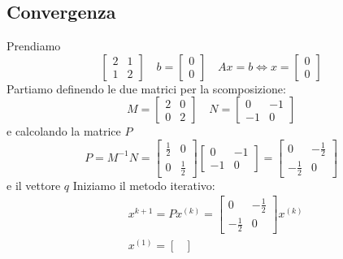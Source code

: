 \subsection{Convergenza}
\begin{example}
	Prendiamo
	\begin{equation*}
		\begin{bmatrix}
			2 & 1 \\
			1 & 2
		\end{bmatrix} \quad
		b = \begin{bmatrix}
			0 \\ 0
		\end{bmatrix} \quad
		Ax=b \Leftrightarrow x=\begin{bmatrix}
			0 \\ 0
		\end{bmatrix}
	\end{equation*}
	Partiamo definendo le due matrici per la scomposizione:
	\begin{equation*}
		M=\begin{bmatrix}
			2 & 0 \\ 0 & 2
		\end{bmatrix} \quad
		N = \begin{bmatrix}
			0 & -1 \\ -1 & 0
		\end{bmatrix}
	\end{equation*}
	e calcolando la matrice $P$
	\begin{equation*}
		P = M^{-1}N = \begin{bmatrix}
			\frac{1}{2} & 0 \\ 0 & \frac{1}{2}
		\end{bmatrix}\begin{bmatrix}
		0 & -1 \\ -1 & 0
		\end{bmatrix} = \begin{bmatrix}
		0 & -\frac{1}{2} \\ -\frac{1}{2} & 0
		\end{bmatrix}
	\end{equation*}
	e il vettore $q$
	Iniziamo il metodo iterativo:
	\begin{equation*}
		\begin{split}
			& x^{k+1} = Px^{(k)} = \begin{bmatrix}
				0 & -\frac{1}{2} \\ -\frac{1}{2} & 0
			\end{bmatrix} x^{(k)} \\
			& x^{(1)} =  \begin{bmatrix}

\end{bmatrix}
\end{split}
\end{equation*}
\end{example}
